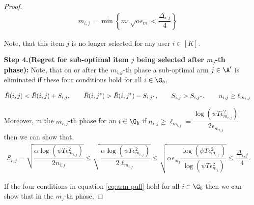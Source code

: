 \begin{proof}
\begin{align*}                                                                                                                                                                                                                                                                                                                                                                                                                                                                                                                                                                                                                                                                                                                                                                                                                                                                     
m_{i,j} = \min\left\lbrace m: \sqrt{\alpha\epsilon_{m}} < \dfrac{\Delta_{i,j}}{4} \right\rbrace
\end{align*} 

Note, that this item $j$ is no longer selected for any user $i\in[K]$.

\textbf{Step 4.(Regret for sub-optimal item $j$ being selected after $m_{j}$-th phase):} Note, that on or after the $m_{i,g}$-th phase a sub-optimal arm $j\in\A'$ is eliminated if these four conditions hold for all $i\in\G_b$,

\begin{eqnarray}
\hat{R}(i,j) < \bar{R}(i,j) + S_{i,j}, \hspace*{2em}  \hat{R}(i,j^*) > \bar{R}(i,j^*) - S_{i,j^*}, \hspace*{2em} S_{i,j} > S_{i,j^*}, \hspace*{2em} n_{i,j} \geq \ell_{m_{i,j}} \label{eq:arm-pull}
\end{eqnarray}

Moreover, in the $m_{i,j}$-th phase for an $i\in\G_b$ if $n_{i,j} \geq \ell_{m_{i,j}} = \dfrac{\log(\psi T\epsilon_{m_{i,j}}^2)}{2\epsilon_{m_{i,j}}}$ then we can show that,
\begin{align*}
S_{i,j} = \sqrt{\dfrac{\alpha\log(\psi T\epsilon_{m_{i,j}}^2)}{2n_{i,j}}} \leq \sqrt{\dfrac{\alpha\log(\psi T\epsilon_{m_{i,j}}^2)}{2\ell_{m_{i,j}}}} \leq \sqrt{\alpha\epsilon_{m_{j}}\dfrac{\log(\psi T\epsilon_{m_{i,j}}^2)}{\log(\psi T\epsilon_{m_{j}}^2)}} \leq \dfrac{\Delta_{i,j}}{4}.
\end{align*}

If the four conditions in equation \ref{eq:arm-pull} hold for all $i\in\G_b$ then we can show that in the $m_{j}$-th phase,


\end{proof}
